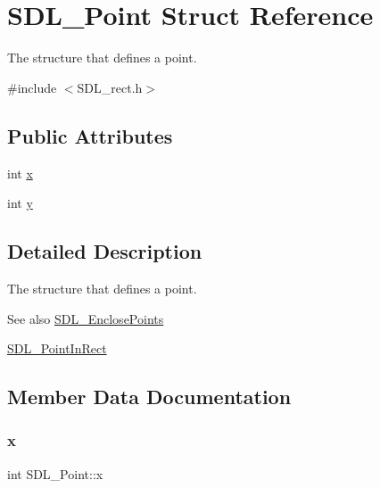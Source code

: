 \hypertarget{struct_s_d_l___point}{}\section{S\+D\+L\+\_\+\+Point Struct Reference}
\label{struct_s_d_l___point}


The structure that defines a point.  




{\ttfamily \#include $<$S\+D\+L\+\_\+rect.\+h$>$}

\subsection*{Public Attributes}
\begin{DoxyCompactItemize}
\item 
int \hyperlink{struct_s_d_l___point_a2ee987d59888024771c8d83aec43056c}{x}
\item 
int \hyperlink{struct_s_d_l___point_aaa68aefa869f6bdf46367a70bd9414b0}{y}
\end{DoxyCompactItemize}


\subsection{Detailed Description}
The structure that defines a point. 

\begin{DoxySeeAlso}{See also}
\hyperlink{_s_d_l__rect_8h_afcbb58dbba760b9e6fdb4b5d1ece015c}{S\+D\+L\+\_\+\+Enclose\+Points} 

\hyperlink{_s_d_l__rect_8h_a2f9708f2739ef234c34e6feda50b4d2c}{S\+D\+L\+\_\+\+Point\+In\+Rect} 
\end{DoxySeeAlso}


\subsection{Member Data Documentation}
\mbox{\label{struct_s_d_l___point_a2ee987d59888024771c8d83aec43056c}} 
\subsubsection{\texorpdfstring{x}{x}}
{\footnotesize\ttfamily int S\+D\+L\+\_\+\+Point\+::x}

